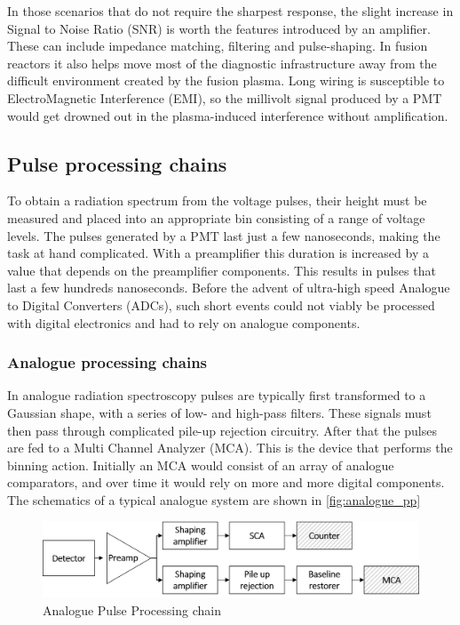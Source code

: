 In those scenarios that do not require the sharpest response,
the slight increase in Signal to Noise Ratio (SNR) is worth the 
features introduced by an amplifier. These can include
impedance matching, filtering and pulse-shaping.
In fusion reactors it also helps move most of the 
diagnostic infrastructure away from the difficult environment
created by the fusion plasma. 
Long wiring is susceptible to ElectroMagnetic Interference (EMI), 
so the millivolt signal produced by a PMT would 
get drowned out in the plasma-induced interference without amplification.

\subsection{Pulse processing chains}

To obtain a radiation spectrum from the voltage pulses,
their height must be measured and
placed into an appropriate bin consisting of a range of voltage levels.
The pulses generated by a PMT last just a few nanoseconds,
making the task at hand complicated.
With a preamplifier this duration is increased by a value
that depends on the preamplifier components.
This results in pulses that last a few hundreds nanoseconds.
Before the advent of ultra-high speed Analogue to Digital Converters (ADCs),
such short events could not viably be processed with digital 
electronics and had to rely on analogue components.

\newpage
\subsubsection{Analogue processing chains}

In analogue radiation spectroscopy
pulses are typically first transformed to a Gaussian shape,
with a series of low- and high-pass filters.
These signals must then pass through complicated pile-up
rejection circuitry. After that the pulses 
are fed to a Multi Channel Analyzer (MCA).
This is the device that performs the binning action.
Initially an MCA would consist of an array of 
analogue comparators, and over time it would rely 
on more and more digital components.
The schematics of a typical analogue system are shown in \autoref{fig:analogue_pp}

\begin{figure}[H]
  \centering
  \includegraphics[width=\linewidth]{media/analog_pulse_processing.png}
  \caption{Analogue Pulse Processing chain}
  \label{fig:analogue_pp}
\end{figure}


